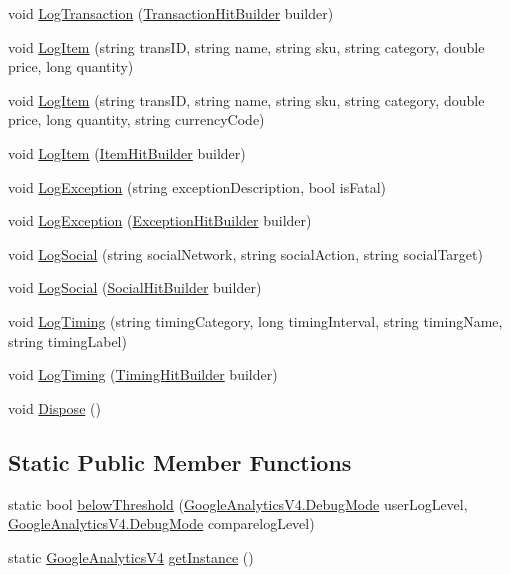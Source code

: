 \begin{DoxyCompactItemize}
\item 
void \hyperlink{class_google_analytics_v4_a7001e127fd4b35d28438fa831e8959ec}{Log\+Transaction} (\hyperlink{class_transaction_hit_builder}{Transaction\+Hit\+Builder} builder)
\item 
void \hyperlink{class_google_analytics_v4_a67f377b324e198df2282a5ccb26954cf}{Log\+Item} (string trans\+ID, string name, string sku, string category, double price, long quantity)
\item 
void \hyperlink{class_google_analytics_v4_a6a8737df7f07ee1ecc4690d2ffdb5a37}{Log\+Item} (string trans\+ID, string name, string sku, string category, double price, long quantity, string currency\+Code)
\item 
void \hyperlink{class_google_analytics_v4_a6ac7e4060abc667ba60b5c7430260e31}{Log\+Item} (\hyperlink{class_item_hit_builder}{Item\+Hit\+Builder} builder)
\item 
void \hyperlink{class_google_analytics_v4_ac8b9366bae403679252396d526cf2b75}{Log\+Exception} (string exception\+Description, bool is\+Fatal)
\item 
void \hyperlink{class_google_analytics_v4_aa31323ed1960904bf4d224e5802bef3b}{Log\+Exception} (\hyperlink{class_exception_hit_builder}{Exception\+Hit\+Builder} builder)
\item 
void \hyperlink{class_google_analytics_v4_a1575f8d720332e6c5f39b15331c83896}{Log\+Social} (string social\+Network, string social\+Action, string social\+Target)
\item 
void \hyperlink{class_google_analytics_v4_a1d8448a6fd87aebbb6958f2b907c0e64}{Log\+Social} (\hyperlink{class_social_hit_builder}{Social\+Hit\+Builder} builder)
\item 
void \hyperlink{class_google_analytics_v4_acb3585828e95d3582df1a9ed12780ee1}{Log\+Timing} (string timing\+Category, long timing\+Interval, string timing\+Name, string timing\+Label)
\item 
void \hyperlink{class_google_analytics_v4_a857ba35a57e5a32534f5407f52f82019}{Log\+Timing} (\hyperlink{class_timing_hit_builder}{Timing\+Hit\+Builder} builder)
\item 
void \hyperlink{class_google_analytics_v4_acde2f7a3194d1155419248307db2ddf3}{Dispose} ()
\end{DoxyCompactItemize}
\subsection*{Static Public Member Functions}
\begin{DoxyCompactItemize}
\item 
static bool \hyperlink{class_google_analytics_v4_a2636156a1842ec77c486978a3d33d39e}{below\+Threshold} (\hyperlink{class_google_analytics_v4_a53191bc619081f5781932db905fbf30d}{Google\+Analytics\+V4.\+Debug\+Mode} user\+Log\+Level, \hyperlink{class_google_analytics_v4_a53191bc619081f5781932db905fbf30d}{Google\+Analytics\+V4.\+Debug\+Mode} comparelog\+Level)
\item 
static \hyperlink{class_google_analytics_v4}{Google\+Analytics\+V4} \hyperlink{class_google_analytics_v4_aa4052b46e75ed98566a2cbef99170667}{get\+Instance} ()
\end{DoxyCompactItemize}
